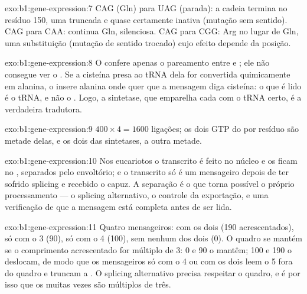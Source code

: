 \begin{solution}{exo:b1:gene-expression:7}
CAG (Gln) para UAG (parada): a cadeia termina no resíduo 150, uma
 truncada e quase certamente inativa (mutação sem sentido). CAG
para CAA: continua Gln, silenciosa. CAG para CGG: Arg no lugar de Gln,
uma substituição (mutação de sentido trocado) cujo efeito depende da
posição.
\end{solution}

\begin{solution}{exo:b1:gene-expression:8}
O  confere apenas o pareamento entre  e ; ele não
consegue ver o . Se a cisteína presa ao tRNA dela for
convertida quimicamente em alanina, o  insere alanina onde
quer que a mensagem diga cisteína: o que é lido é o tRNA, e não o
. Logo, a sintetase, que emparelha cada  com o tRNA
certo, é a verdadeira tradutora.
\end{solution}

\begin{solution}{exo:b1:gene-expression:9}
$400\times 4 = 1600$ ligações; os dois GTP do  por resíduo são
metade delas, e os dois das sintetases, a outra metade.
\end{solution}

\begin{solution}{exo:b1:gene-expression:10}
Nos eucariotos o transcrito é feito no núcleo e os  ficam no
, separados pelo envoltório; e o transcrito só é um mensageiro
depois de ter sofrido splicing e recebido o capuz. A separação é o que
torna possível o próprio processamento --- o splicing alternativo, o
controle da exportação, e uma verificação de que a mensagem está
completa antes de ser lida.
\end{solution}

\begin{solution}{exo:b1:gene-expression:11}
Quatro mensageiros: com os dois  (190  acrescentados),
só com o 3 (90), só com o 4 (100), sem nenhum dos dois (0). O quadro se
mantém se o comprimento acrescentado for múltiplo de 3: 0 e 90 o mantêm;
100 e 190 o deslocam, de modo que os mensageiros só com o  4 ou com
os dois  leem o  5 fora do quadro e truncam a . O
splicing alternativo precisa respeitar o quadro, e é por isso que os
 muitas vezes são múltiplos de três.
\end{solution}

